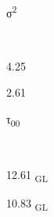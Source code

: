 \documentclass[
  letterpaper,
  DIV=11,
  numbers=noendperiod]{scrartcl}
\begin{document}
\begin{table}
\begin{minipage}[t]{\linewidth}
{σ\textsuperscript{2}

}

\end{minipage}%
\newline
\begin{minipage}[t]{\linewidth}

{\centering 

~

}

\end{minipage}%
\newline
\begin{minipage}[t]{\linewidth}

{\centering 

4.25

}

\end{minipage}%
\newline
\begin{minipage}[t]{\linewidth}

{\centering 

2.61

}

\end{minipage}%
\newline
\begin{minipage}[t]{\linewidth}

{\centering 

τ\textsubscript{00}

}

\end{minipage}%
\newline
\begin{minipage}[t]{\linewidth}

{\centering 

~

}

\end{minipage}%
\newline
\begin{minipage}[t]{\linewidth}

{\centering 

12.61 \textsubscript{GL}

}

\end{minipage}%
\newline
\begin{minipage}[t]{\linewidth}

{\centering 

10.83 \textsubscript{GL}

}
\end{minipage}
\end{table}
\end{document}
